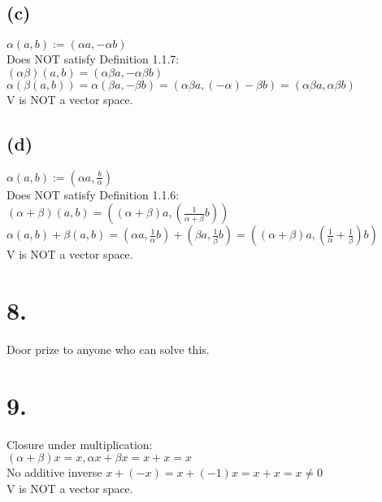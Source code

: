\documentclass{article}
\begin{document}
\subsection*{(c)}
$\alpha(a,b) := (\alpha a,-\alpha b)$\\
Does NOT satisfy Definition 1.1.7:\\ 
$(\alpha\beta)(a,b) = (\alpha\beta a, -\alpha\beta b)$\\
$\alpha(\beta(a,b)) = \alpha(\beta a, -\beta b) = (\alpha\beta a, (-\alpha)-\beta b) = (\alpha\beta a, \alpha\beta b)$\\
V is NOT a vector space.
\subsection*{(d)}
$\alpha(a,b) := (\alpha a,\frac{b}{\alpha})$\\
Does NOT satisfy Definition 1.1.6:\\
$(\alpha + \beta)(a,b) = ((\alpha+\beta)a, (\frac{1}{\alpha+\beta}b))$\\
$\alpha(a,b) + \beta(a,b) = (\alpha a, \frac{1}{\alpha}b) +  (\beta a, \frac{1}{\beta}b) = ((\alpha+\beta)a, (\frac{1}{\alpha} + \frac{1}{\beta}) b)$\\
V is NOT a vector space.

\section*{8.}
Door prize to anyone who can solve this.
\section*{9.}
Closure under multiplication:\\
$(\alpha + \beta)x = x, \alpha x + \beta x = x + x = x$\\
No additive inverse
$x + (-x) = x + (-1)x = x + x = x \ne 0$\\
V is NOT a vector space.
\end{document}
